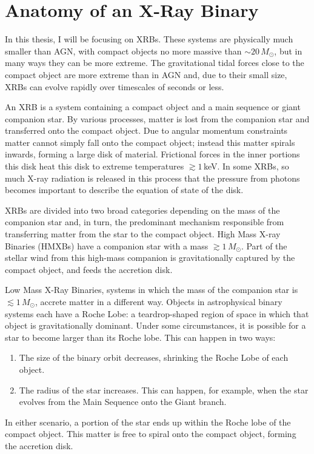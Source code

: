 \section{Anatomy of an X-Ray Binary}

\par In this thesis, I will be focusing on XRBs.  These systems are physically much smaller than AGN, with compact objects no more massive than $\sim20\,M_\odot$, but in many ways they can be more extreme.  The gravitational tidal forces close to the compact object are more extreme than in AGN and, due to their small size, XRBs can evolve rapidly over timescales of seconds or less.
\par An XRB is a system containing a compact object and a main sequence or giant companion star.  By various processes, matter is lost from the companion star and transferred onto the compact object.  Due to angular momentum constraints matter cannot simply fall onto the compact object; instead this matter spirals inwards, forming a large disk of material.  Frictional forces in the inner portions this disk heat this disk to extreme temperatures $\gtrsim1$\,keV.  In some XRBs, so much X-ray radiation is released in this process that the pressure from photons becomes important to describe the equation of state of the disk.
\par XRBs are divided into two broad categories depending on the mass of the companion star and, in turn, the predominant mechanism responsible from transferring matter from the star to the compact object.  High Mass X-ray Binaries (HMXBs) have a companion star with a mass $\gtrsim1\,M_\odot$.  Part of the stellar wind from this high-mass companion is gravitationally captured by the compact object, and feeds the accretion disk.
\par Low Mass X-Ray Binaries, systems in which the mass of the companion star is $\lesssim1\,M_\odot$, accrete matter in a different way.  Objects in astrophysical binary systems each have a Roche Lobe: a teardrop-shaped region of space in which that object is gravitationally dominant.  Under some circumstances, it is possible for a star to become larger than its Roche lobe.  This can happen in two ways:
\begin{enumerate}
\item The size of the binary orbit decreases, shrinking the Roche Lobe of each object.
\item The radius of the star increases.  This can happen, for example, when the star evolves from the Main Sequence onto the Giant branch.
\end{enumerate}
In either scenario, a portion of the star ends up within the Roche lobe of the compact object.  This matter is free to spiral onto the compact object, forming the accretion disk.

